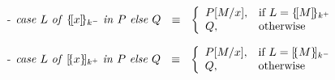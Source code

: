 \documentclass[10pt,a4paper,final,oneside,fleqn]{book}
\begin{document}
\begin{itemize}
\item[-]
$\mbox{{\itshape case\/} }L\mbox{ {\itshape of\/} }\{\![x]\!\}_{k^-}\mbox{ {\itshape in\/} }P\mbox{ {\itshape else\/} }Q~~\equiv~~\left\{\begin{array}{ll}P[M/x],&\mbox{if }L=\{\![M]\!\}_{k^+}\\Q,&\mbox{otherwise}\end{array}\right.$
\item[-]
$\mbox{{\itshape case\/} }L\mbox{ {\itshape of\/} }[\!\{x\}\!]_{k^+}\mbox{ {\itshape in\/} }P\mbox{ {\itshape else\/} }Q~~\equiv~~\left\{\begin{array}{ll}P[M/x],&\mbox{if }L=[\!\{M\}\!]_{k^-}\\Q,&\mbox{otherwise}\end{array}\right.$
\end{itemize}
\end{document}
